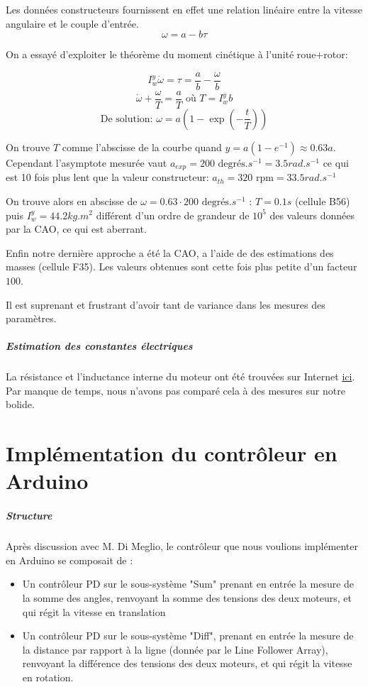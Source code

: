 \documentclass{report}
\begin{document}
Les données constructeurs fournissent en effet une relation 
linéaire entre la vitesse angulaire et le couple d'entrée. $$\omega = a - b\tau$$

On a essayé d'exploiter le théorème du moment cinétique à l'unité roue+rotor:

$$I_w^y\dot{\omega} = \tau = \frac{a}{b} - \frac{\omega}{b}$$
$$\dot{\omega} +  \frac{\omega}{T} = \frac{a}{T} \text{  où  } T=I_w^yb$$
$$\text{De solution: } \omega = a\left(1 - \exp\left(-\frac{t}{T}\right) \right)$$

On trouve $T$ comme l'abscisse de la courbe quand $y=a\left(1 - e^{-1}\right) \approx 0.63a$. 
Cependant l'asymptote mesurée vaut $a_{exp} = 200 \text{ degrés}.s^{-1} = 3.5 rad.s^{-1}$ 
ce qui est 10 fois plus lent que la valeur constructeur: $a_{th} = 320 \text{ rpm} = 33.5 rad.s^{-1}$

On trouve alors en abscisse de $\omega = 0.63\cdot200 \text{ degrés}.s^{-1}$ : $T=0.1s$ (cellule B56) 
puis $I_w^y = 44.2 kg.m^2$ différent d'un ordre de grandeur de $10^5$ des valeurs données par la CAO,
ce qui est aberrant.

Enfin notre dernière approche a été la CAO, a l'aide de des estimations des masses (cellule F35).
Les valeurs obtenues sont cette fois plus petite d'un facteur $100$.

Il est suprenant et frustrant d'avoir tant de variance dans les mesures des paramètres.


\paragraph{Estimation des constantes électriques}
La résistance et l'inductance interne du moteur ont été trouvées sur Internet 
\href{https://forum.pololu.com/t/mechanics-and-electrical-parameters/18153/2}{ici}.
Par manque de temps, nous n'avons pas comparé cela à des mesures sur notre bolide.

\chapter{Implémentation du contrôleur en Arduino}
\paragraph{Structure}

Après discussion avec M. Di Meglio, le contrôleur que nous voulions implémenter en Arduino se composait de :
\begin{itemize}
\item Un contrôleur PD sur le sous-système "Sum" prenant en entrée la mesure de la somme des angles, renvoyant la somme des tensions des deux moteurs, et qui régit la vitesse en translation
\item Un contrôleur PD sur le sous-système "Diff", prenant en entrée la mesure de la distance par rapport à la ligne (donnée par le Line Follower Array), renvoyant la différence des tensions des deux moteurs, et qui régit la vitesse en rotation.
\end{itemize}
\end{document}
